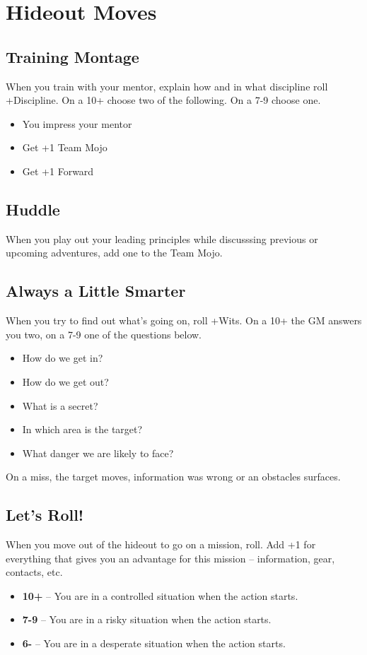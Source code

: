 \documentclass{book}
\begin{document}
\chapter*{Hideout Moves}
\section*{Training Montage}
When you train with your mentor, explain how and in what discipline roll +Discipline. On a 10+ choose two of the following. On a 7-9 choose one.
\begin{itemize}
    \item You impress your mentor
    \item Get +1 Team Mojo
    \item Get +1 Forward
\end{itemize}

\section*{Huddle}
When you play out your leading principles while discusssing previous or upcoming adventures, add one to the Team Mojo.

\section*{Always a Little Smarter}
When you try to find out what's going on, roll +Wits. On a 10+ the GM answers you two, on a 7-9 one of the questions below.
\begin{itemize}
    \item How do we get in?
    \item How do we get out?
    \item What is a secret?
    \item In which area is the target?
    \item What danger we are likely to face?
\end{itemize}
On a miss, the target moves, information was wrong or an obstacles surfaces.

\section*{Let's Roll!}
When you move out of the hideout to go on a mission, roll. Add +1 for everything that gives you an advantage for this mission -- information, gear, contacts, etc.
\begin{itemize}
    \item \textbf{10+} -- You are in a controlled situation when the action starts.
    \item \textbf{7-9} -- You are in a risky situation when the action starts.
    \item \textbf{6-} -- You are in a desperate situation when the action starts.
\end{itemize}
\end{document}
